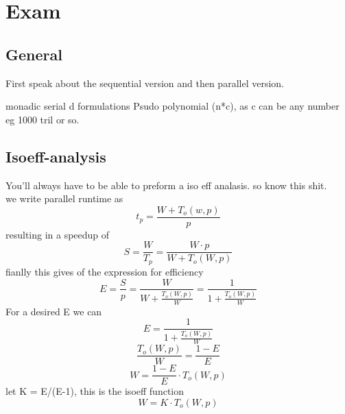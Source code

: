 \documentclass[a4paper,10pt,titlepage]{report}
\date{}
\begin{document}
\renewcommand{\thepage}{\roman{page}}%
\tableofcontents
\newpage
\setcounter{page}{1}
\renewcommand{\thepage}{\arabic{page}}
\section{Exam}

\subsection{General}
First speak about the sequential version and then parallel version.

monadic serial d formulations
Psudo polynomial (n*c), as c can be any number eg 1000 tril or so.

\subsection{Isoeff-analysis}
You'll always have to be able to preform a iso eff analasis. so know this shit. \\
we write parallel runtime as
\begin{equation}
t_p = \frac{W+T_o(w,p)}{p}
\end{equation}
resulting in a speedup of
\begin{equation}
S = \frac{W}{T_p} = \frac{W\cdot p}{W+T_o(W,p)}
\end{equation}
fianlly this gives of the expression for efficiency
\begin{equation}
E = \frac{S}{p} = \frac{W}{W+\frac{T_o(W,p)}{W}}= \frac{1}{1+\frac{T_o(W,p)}{W}}
\end{equation}
For a desired E we can 
\begin{equation}
E = \frac{1}{1+\frac{T_o(W,p)}{W}}
\end{equation}
\begin{equation}
\frac{T_o(W,p)}{W} = \frac{1-E}{E}
\end{equation}
\begin{equation}
W = \frac{1-E}{E}\cdot T_o(W,p)
\end{equation}
let K = E/(E-1), this is the isoeff function
\begin{equation}
W = K\cdot T_o(W,p)
\end{equation}
   
\newpage
\end{document}
